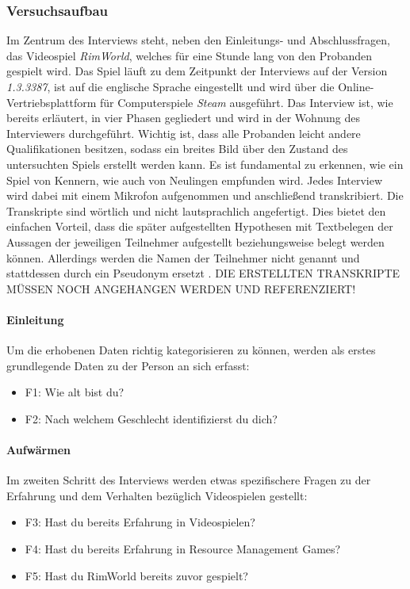 \subsubsection{Versuchsaufbau}
Im Zentrum des Interviews steht, neben den Einleitungs- und Abschlussfragen, das Videospiel \textit{RimWorld}, welches für eine Stunde lang von den Probanden gespielt wird. Das Spiel läuft zu dem Zeitpunkt der Interviews auf der Version \textit{1.3.3387}, ist auf die englische Sprache eingestellt und wird über die Online-Vertriebsplattform für Computerspiele \textit{Steam} ausgeführt.
Das Interview ist, wie bereits erläutert, in vier Phasen gegliedert und wird in der Wohnung des Interviewers durchgeführt. Wichtig ist, dass alle Probanden leicht andere Qualifikationen besitzen, sodass ein breites Bild über den Zustand des untersuchten Spiels erstellt werden kann. Es ist fundamental zu erkennen, wie ein Spiel von Kennern, wie auch von Neulingen empfunden wird. Jedes Interview wird dabei mit einem Mikrofon aufgenommen und anschließend transkribiert. Die Transkripte sind wörtlich und nicht lautsprachlich angefertigt. Dies bietet den einfachen Vorteil, dass die später aufgestellten Hypothesen mit Textbelegen der Aussagen der jeweiligen Teilnehmer aufgestellt beziehungsweise belegt werden können. Allerdings werden die Namen der Teilnehmer nicht genannt und stattdessen durch ein Pseudonym ersetzt \cite*[S.97]{lankoski_bjork}. DIE ERSTELLTEN TRANSKRIPTE MÜSSEN NOCH ANGEHANGEN WERDEN UND REFERENZIERT!
 
\paragraph {Einleitung}
Um die erhobenen Daten richtig kategorisieren zu können, werden als erstes grundlegende Daten zu der Person an sich erfasst:
\begin{itemize}
    \item F1: Wie alt bist du?
    \item F2: Nach welchem Geschlecht identifizierst du dich?
\end{itemize}

\paragraph{Aufwärmen}
Im zweiten Schritt des Interviews werden etwas spezifischere Fragen zu der Erfahrung und dem Verhalten bezüglich Videospielen gestellt:
\begin{itemize}
    \item F3: Hast du bereits Erfahrung in Videospielen?
    \item F4: Hast du bereits Erfahrung in Resource Management Games?
    \item F5: Hast du RimWorld bereits zuvor gespielt?
\end{itemize}

